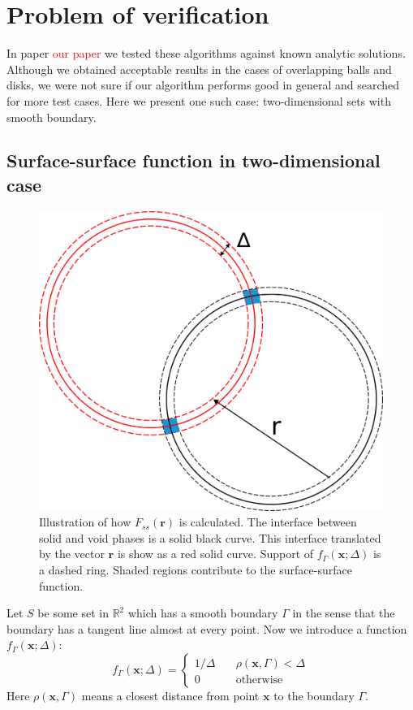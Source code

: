 \documentclass[reprint,amsmath,amssymb,aps,pre,showkeys,showpacs]{revtex4-1}
\begin{document}
\section{Problem of verification}
\label{sec:verify}
In paper \textcolor{red}{our paper} we tested these algorithms against known
analytic solutions. Although we obtained acceptable results in the cases of
overlapping balls and disks, we were not sure if our algorithm performs good in
general and searched for more test cases. Here we present one such case:
two-dimensional sets with smooth boundary.

\subsection{Surface-surface function in two-dimensional case}
\label{sec:fss-2d}
\begin{figure}
  \centering
  \includegraphics[width=0.8\linewidth]{images/Fss.png}
  \caption[]{Illustration of how $F_{ss}(\bm{r})$ is calculated. The interface
    between solid and void phases is a solid black curve. This interface
    translated by the vector $\bm{r}$ is show as a red solid curve. Support of
    $f_\Gamma(\bm{x}; \Delta)$ is a dashed ring. Shaded regions contribute to
    the surface-surface function.}
  \label{fig:Fss-explained}
\end{figure}
Let $S$ be some set in $\mathbb{R}^2$ which has a smooth boundary $\Gamma$ in
the sense that the boundary has a tangent line almost at every point. Now we
introduce a function $f_\Gamma(\bm{x}; \Delta)$:
\begin{equation*}
  f_\Gamma(\bm{x}; \Delta) = \left\{
  \begin{array}{ll}
    1/\Delta & \quad \rho(\bm{x}, \Gamma) < \Delta \\
    0 & \quad \text{otherwise}
  \end{array}
  \right.
\end{equation*}
Here $\rho(\bm{x}, \Gamma)$ means a closest distance from point $\bm{x}$ to the
boundary $\Gamma$.
\end{document}
